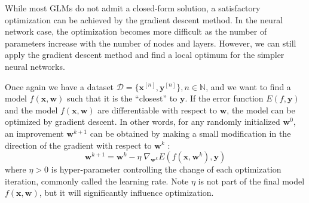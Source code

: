 
While most GLMs do not admit a closed-form solution,
a satisfactory optimization can be achieved by the gradient descent method.
In the neural network case,
the optimization becomes more difficult as
the number of parameters increase with the number of nodes and layers.
However, we can still apply the gradient descent method
and find a local optimum for the simpler neural networks. \cite{Bi07}

Once again we have a dataset $\mathcal{D} = \{\mathbf{x}^{[n]}, 
\mathbf{y}^{[n]}\}, n \in \mathbb{N}$,
and we want to find a model $f(\mathbf{x},\mathbf{w})$ such that 
it is the ``closest'' to $\mathbf{y}$.
If the error function $E(f,\mathbf{y})$
and the model $f(\mathbf{x},\mathbf{w})$ are differentiable
with respect to $\mathbf{w}$,
the model can be optimized by gradient descent.
In other words, for any randomly initialized $\mathbf{w}^0$,
an improvement $\mathbf{w}^{k+1}$ can be obtained by making a 
small modification
in the direction of the gradient with respect to $\mathbf{w}^k$ :
%
\begin{equation*}
	\mathbf{w}^{k+1} = \mathbf{w}^{k} - \eta \; \nabla_{\mathbf{w}^k} 
					E\left(f(\mathbf{x},\mathbf{w}^k),\mathbf{y}\right)
\end{equation*}
%
where $\eta > 0$ is hyper-parameter controlling the change of 
each optimization iteration, commonly called the learning rate.
Note $\eta$ is not part of the final model $f(\mathbf{x},\mathbf{w})$,
but it will significantly influence optimization.

